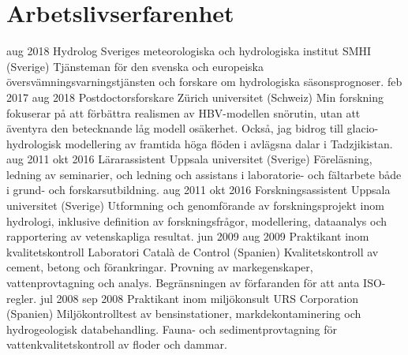 \ifswedish
  \section{Arbetslivserfarenhet}
    \position
      {aug 2018 \textemdash{} }
      {Hydrolog}
      {Sveriges meteorologiska och hydrologiska institut SMHI (Sverige)}
      {Tjänsteman för den svenska och europeiska översvämningsvarningstjänsten och forskare om hydrologiska säsonsprognoser.}
    \position
      {feb 2017 \textemdash{} aug 2018}
      {Postdoctorsforskare}
      {Zürich universitet (Schweiz)}
      {Min forskning fokuserar på att förbättra realismen av HBV-modellen snörutin, utan att äventyra den betecknande låg modell osäkerhet. Också, jag bidrog till glacio-hydrologisk modellering av framtida höga flöden i avlägsna dalar i Tadzjikistan.}
    \position
      {aug 2011 \textemdash{} okt 2016}
      {Lärarassistent}
      {Uppsala universitet (Sverige)}
      {Föreläsning, ledning av seminarier, och ledning och assistans i laboratorie- och fältarbete både i grund- och forskarsutbildning.}
    \position
      {aug 2011 \textemdash{} okt 2016}
      {Forskningsassistent}
      {Uppsala universitet (Sverige)}
      {Utformning och genomförande av forskningsprojekt inom hydrologi, inklusive definition av forskningsfrågor, modellering, dataanalys och rapportering av vetenskapliga resultat.}
    \position
      {jun 2009 \textemdash{} aug 2009}
      {Praktikant inom kvalitetskontroll}
      {Laboratori Català de Control (Spanien)}
      {Kvalitetskontroll av cement, betong och förankringar. Provning av markegenskaper, vattenprovtagning och analys. Begränsningen av förfaranden för att anta ISO-regler.}
    \position
      {jul 2008 \textemdash{} sep 2008}
      {Praktikant inom miljökonsult}
      {URS Corporation (Spanien)}
      {Miljökontrolltest av bensinstationer, markdekontaminering och hydrogeologisk databehandling. Fauna- och sedimentprovtagning för vattenkvalitetskontroll av floder och dammar.}
\else
